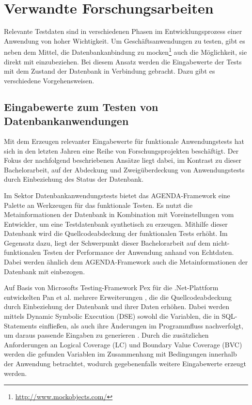 \section{Verwandte Forschungsarbeiten}\label{chap:relatedwork}

%
%

Relevante Testdaten sind in verschiedenen Phasen im Entwicklungsprozess einer Anwendung von hoher Wichtigkeit.
Um Geschäftsanwendungen zu testen, gibt es neben dem Mittel, die Datenbankanbindung zu mocken\footnote{\url{http://www.mockobjects.com/}} auch die Möglichkeit, sie direkt mit einzubeziehen.
Bei diesem Ansatz werden die Eingabewerte der Tests mit dem Zustand der Datenbank in Verbindung gebracht.
Dazu gibt es verschiedene Vorgehensweisen.

\subsection{Eingabewerte zum Testen von Datenbankanwendungen}
Mit dem Erzeugen relevanter Eingabewerte für funktionale Anwendungstests hat sich in den letzten Jahren eine Reihe von Forschungsprojekten beschäftigt.
Der Fokus der nachfolgend beschriebenen Ansätze liegt dabei, im Kontrast zu dieser Bachelorarbeit, auf der Abdeckung und Zweigüberdeckung von Anwendungstests durch Einbeziehung des Status der Datenbank.

Im Sektor Datenbankanwendungstests bietet das AGENDA-Framework \cite{Chays:2000:FTD:347324.348954, Chays:2004:TDG:997669, Chays:2004:ATR:1077269.1077271, Deng:2005:TDT:1062455.1062486, Chays:2008:QTG:1385269.1385277} eine Palette an Werkzeugen für das funktionale Testen.
Es nutzt die Metainformationen der Datenbank in Kombination mit Voreinstellungen vom Entwickler, um eine Testdatenbank synthetisch zu erzeugen.
Mithilfe dieser Datenbank wird die Quellcodeabdeckung der funktionalen Tests erhöht.
Im Gegensatz dazu, liegt der Schwerpunkt dieser Bachelorarbeit auf dem nicht-funktionalen Testen der Performance der Anwendung anhand von Echtdaten.
Dabei werden ähnlich dem AGENDA-Framework auch die Metainformationen der Datenbank mit einbezogen.

Auf Basis von Microsofts Testing-Framework Pex für die .Net-Plattform \cite{Tillmann:2008:PWB:1792786.1792798} entwickelten Pan et al. mehrere Erweiterungen \cite{Pan:2011:GPI:2190078.2190154, Pan:2011:DSG:1988842.1988846}, die die Quellcodeabdeckung durch Einbeziehung der Datenbank und ihrer Daten erhöhen.
Dabei werden mittels Dynamic Symbolic Execution (DSE) \cite{Cadar:2006:EAG:1180405.1180445, Godefroid:2005:DDA:1065010.1065036} sowohl die Variablen, die in SQL-Statements einfließen, als auch ihre Änderungen im Programmfluss nachverfolgt, um daraus passende Eingaben zu generieren \cite{Pan:2011:GPI:2190078.2190154}.
Durch die zusätzlichen Anforderungen an Logical Coverage (LC) \cite{DBLP:conf/issre/AmmannOH03} und Boundary Value Coverage (BVC) \cite{DBLP:conf/issre/KosmatovLPU04} werden die gefunden Variablen im Zusammenhang mit Bedingungen innerhalb der Anwendung betrachtet, wodurch gegebenenfalls weitere Eingabewerte erzeugt werden.

